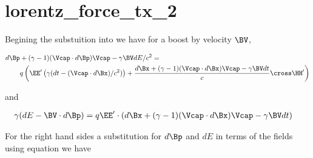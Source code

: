 %
%
%
%
%
%
%
%
\chapter{lorentz_force_tx_2}

Begining the substuition into  we have for a boost by velocity $\BV$, 

\begin{equation}\label{eqn:lorentz_force_tx_2:20}
\begin{aligned}
d\Bp &+ (\gamma-1)(\Vcap \cdot d\Bp) \Vcap - \gamma \BV dE/c^2 = \\
&q \left( \EE' \left(\gamma ( dt - (\Vcap \cdot d\Bx )/c^2 )\right) + \frac{d\Bx + (\gamma-1)(\Vcap \cdot d\Bx) \Vcap - \gamma \BV dt}{c} \cross \HH' \right)  \\
\end{aligned}
\end{equation}

and

\begin{equation}\label{eqn:lorentz_force_tx_2:40}
\begin{aligned}
\gamma ( dE - \BV \cdot d\Bp ) &= q \EE' \cdot \left(d\Bx + (\gamma-1)(\Vcap \cdot d\Bx) \Vcap - \gamma \BV dt\right)
\end{aligned}
\end{equation}

For the right hand sides a substitution for $d\Bp$ and $dE$ in terms of the fields using equation
 we have


